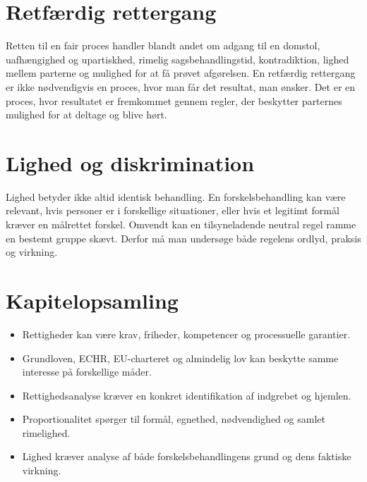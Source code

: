 \section{Retfærdig rettergang}

Retten til en fair proces handler blandt andet om adgang til en domstol, uafhængighed og upartiskhed, rimelig sagsbehandlingstid, kontradiktion, lighed mellem parterne og mulighed for at få prøvet afgørelsen. En retfærdig rettergang er ikke nødvendigvis en proces, hvor man får det resultat, man ønsker. Det er en proces, hvor resultatet er fremkommet gennem regler, der beskytter parternes mulighed for at deltage og blive hørt.

\section{Lighed og diskrimination}

Lighed betyder ikke altid identisk behandling. En forskelsbehandling kan være relevant, hvis personer er i forskellige situationer, eller hvis et legitimt formål kræver en målrettet forskel. Omvendt kan en tilsyneladende neutral regel ramme en bestemt gruppe skævt. Derfor må man undersøge både regelens ordlyd, praksis og virkning.



\section*{Kapitelopsamling}
\begin{itemize}
  \item Rettigheder kan være krav, friheder, kompetencer og processuelle garantier.
  \item Grundloven, ECHR, EU-charteret og almindelig lov kan beskytte samme interesse på forskellige måder.
  \item Rettighedsanalyse kræver en konkret identifikation af indgrebet og hjemlen.
  \item Proportionalitet spørger til formål, egnethed, nødvendighed og samlet rimelighed.
  \item Lighed kræver analyse af både forskelsbehandlingens grund og dens faktiske virkning.
\end{itemize}
